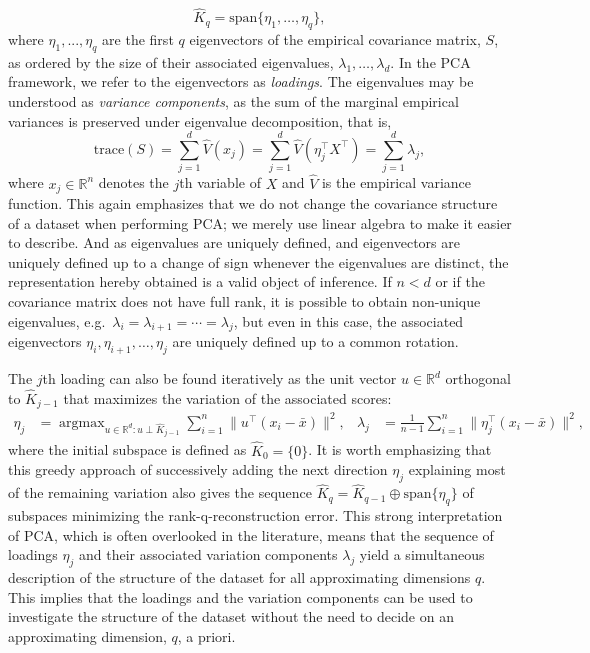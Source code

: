 \documentclass[a4paper,14pt]{article}
\newcommand{\RR}{\mathbb{R}}
\DeclareMathOperator*{\argmax}{argmax}
\begin{document}
\begin{equation*}
\hat{K}_q = \text{span}\{\eta_1,\dotsc,\eta_q\},
\end{equation*}
where $\eta_1, ..., \eta_q$ are the first $q$ eigenvectors of the empirical covariance matrix, $S$, as ordered by the size of their associated eigenvalues, $\lambda_1, \dotsc, \lambda_d$. In the PCA framework, we refer to the eigenvectors as \textit{loadings}. The eigenvalues may be understood as \textit{variance components}, as the sum of the marginal empirical variances is preserved under eigenvalue decomposition, that is,
\begin{equation*}
\text{trace}(S) = \sum_{j=1}^d \hat{V}(x_j) = \sum_{j=1}^d \hat{V}(\eta_j^\top X^\top) = \sum_{j=1}^d \lambda_j,
\end{equation*}
where $x_j \in \RR^n$ denotes the $j$th variable of $X$ and $\hat{V}$ is the empirical variance function. This again emphasizes that we do not change the covariance structure of a dataset when performing PCA; we merely use linear algebra to make it easier to describe. And as eigenvalues are uniquely defined, and eigenvectors are uniquely defined up to a change of sign whenever the eigenvalues are %
distinct, the representation hereby obtained is a valid object of inference. If $n < d$ or if the covariance matrix does not have full rank, it is possible to obtain non-unique eigenvalues, e.g.\ $\lambda_i=\lambda_{i+1}=\dotsm=\lambda_j$, but even in this case, the associated eigenvectors $\eta_i,\eta_{i+1},\dotsc,\eta_j$ are uniquely defined up to a common rotation.

The $j$th loading can also be found iteratively as the unit vector $u \in \RR^d$ orthogonal to $\hat{K}_{j-1}$ that maximizes the variation of the associated scores:
\begin{align*}
\eta_j &= \argmax_{u \in \RR^d\colon u \perp \hat{K}_{j-1}} \sum_{i=1}^n \lVert u^\top (x_i - \bar{x}) \rVert^2, &
\lambda_j &= \frac{1}{n-1} \sum_{i=1}^n \lVert \eta_j^\top (x_i - \bar{x}) \rVert^2,
\end{align*}
where the initial subspace is defined as $\hat{K}_0 = \{0\}$. It is worth emphasizing that this greedy approach of successively adding the next direction $\eta_j$ explaining most of the remaining variation also gives the sequence $\hat{K}_q = \hat{K}_{q-1} \oplus \text{span} \{\eta_q\}$ of subspaces minimizing the rank-q-reconstruction error. This strong interpretation of PCA, which is often overlooked in the literature, means that the sequence of loadings $\eta_j$ and their associated variation components $\lambda_j$ yield a simultaneous description of the structure of the dataset for all approximating dimensions $q$. This implies that the loadings and the variation components can be used to investigate the structure of the dataset without the need to decide on an approximating dimension, $q$, a priori.
\end{document}
